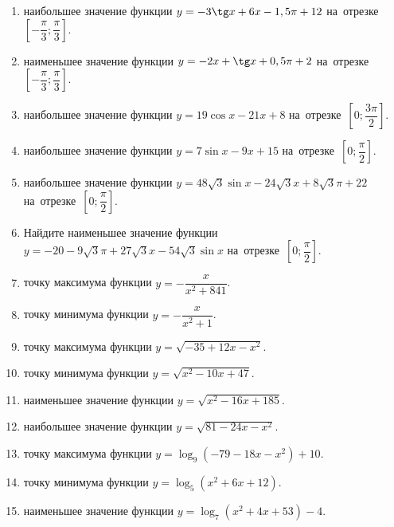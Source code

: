\documentclass[a4paper,10pt]{article}
\begin{document}
\begin{enumerate}
\item {} наибольшее значение функции $y=-3\tg x +6x-1,5\pi +12$ на~отрезке~$\left[-\dfrac{\pi}{3};\dfrac{\pi}{3}\right]$.

\item {} наименьшее значение функции $y=-2x +\tg x+0,5\pi+2$ на~отрезке~$\left[-\dfrac{\pi}{3};\dfrac{\pi}{3}\right]$.

\item {} наибольшее значение функции $y=19\cos x-21x+8$ на~отрезке~$\left[0;\dfrac{3\pi}{2}\right]$.

\item {} наибольшее значение функции $y=7\sin x-9x+15$ на~отрезке~$\left[0;\dfrac{\pi}{2}\right]$.

\item {} наибольшее значение функции $y=48\sqrt{3}\sin x-24\sqrt{3}x+8\sqrt{3}\pi +22$ на~отрезке~$\left[0;\dfrac{\pi}{2}\right]$.

\item Найдите наименьшее значение функции $y=-20-9\sqrt{3}\pi+27\sqrt{3}x-54\sqrt{3}\sin x$ на~отрезке~$\left[0;\dfrac{\pi}{2}\right]$.

\item {} точку максимума функции $y=-\dfrac{x}{ x^2 +841}$.

\item {} точку минимума функции $y=-\dfrac{x}{ x^2 +1}$.

\item {} точку максимума функции $y=\sqrt{-35+12x-x^2}$.

\item {} точку минимума функции $y=\sqrt{x^2-10x+47}$.

\item {} наименьшее значение функции $y=\sqrt{x^2-16x+185}$.

\item {} наибольшее значение функции $y=\sqrt{81-24x-x^2}$.

\item {} точку максимума функции $y=\log_9\left(-79-18x-x^2\right)+10$.

\item {} точку минимума функции $y=\log_5\left(x^2+6x+12\right)$.

\item {} наименьшее значение функции $y=\log_7\left(x^2+4x+53\right)-4$.


\end{enumerate}
\end{document}
